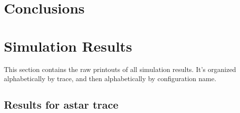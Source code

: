 \documentclass{article}
\begin{document}
\section{Conclusions}



\clearpage
\appendix
\section{Simulation Results}

This section contains the raw printouts of all simulation results. It's
organized alphabetically by trace, and then alphabetically by configuration
name.

\clearpage
\subsection{Results for astar trace}


\clearpage


\clearpage


\clearpage


\clearpage


\clearpage


\clearpage


\clearpage
\end{document}
